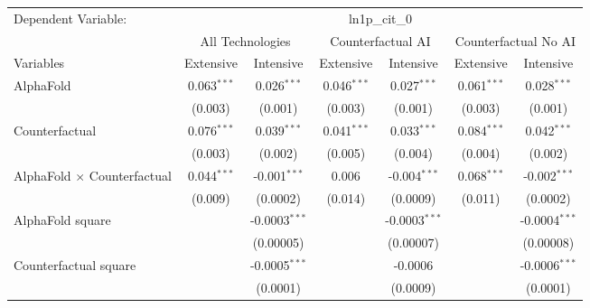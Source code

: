 \begingroup
\centering
\begin{tabular}{lcccccc}
   \tabularnewline \midrule \midrule
   Dependent Variable: & \multicolumn{6}{c}{ln1p\_cit\_0}\\
 & \multicolumn{2}{c}{All Technologies} & \multicolumn{2}{c}{Counterfactual AI} & \multicolumn{2}{c}{Counterfactual No AI} \\
\cmidrule(lr){1-1}\cmidrule(lr){2-3} \cmidrule(lr){4-5} \cmidrule(lr){6-7}
Variables & \multicolumn{1}{c}{Extensive} & \multicolumn{1}{c}{Intensive} & \multicolumn{1}{c}{Extensive} & \multicolumn{1}{c}{Intensive} & \multicolumn{1}{c}{Extensive} & \multicolumn{1}{c}{Intensive} \\
\cmidrule(lr){1-1}\cmidrule(lr){2-2} \cmidrule(lr){3-3} \cmidrule(lr){4-4} \cmidrule(lr){5-5} \cmidrule(lr){6-6} \cmidrule(lr){7-7}
   AlphaFold                          & 0.063$^{***}$ & 0.026$^{***}$     & 0.046$^{***}$ & 0.027$^{***}$    & 0.061$^{***}$ & 0.028$^{***}$\\   
                                      & (0.003)       & (0.001)           & (0.003)       & (0.001)          & (0.003)       & (0.001)\\   
   Counterfactual                     & 0.076$^{***}$ & 0.039$^{***}$     & 0.041$^{***}$ & 0.033$^{***}$    & 0.084$^{***}$ & 0.042$^{***}$\\   
                                      & (0.003)       & (0.002)           & (0.005)       & (0.004)          & (0.004)       & (0.002)\\   
   AlphaFold $\times$ Counterfactual  & 0.044$^{***}$ & -0.001$^{***}$    & 0.006         & -0.004$^{***}$   & 0.068$^{***}$ & -0.002$^{***}$\\   
                                      & (0.009)       & (0.0002)          & (0.014)       & (0.0009)         & (0.011)       & (0.0002)\\   
   AlphaFold square                   &               & -0.0003$^{***}$   &               & -0.0003$^{***}$  &               & -0.0004$^{***}$\\   
                                      &               & (0.00005)         &               & (0.00007)        &               & (0.00008)\\   
   Counterfactual square              &               & -0.0005$^{***}$   &               & -0.0006          &               & -0.0006$^{***}$\\   
                                      &               & (0.0001)          &               & (0.0009)         &               & (0.0001)\\   

\end{tabular}
